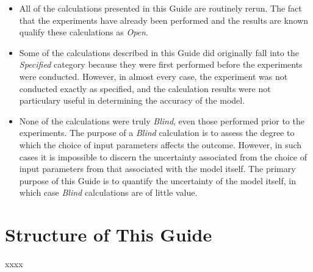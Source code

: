 \begin{itemize}
\item All of the calculations presented in this Guide are routinely rerun. The fact that the experiments have already been performed and the results are known qualify these calculations as {\em Open}.
\item Some of the calculations described in this Guide did originally fall into the {\em Specified} category because they were first performed before the experiments were conducted. However, in almost every case, the experiment was not conducted exactly as specified, and the calculation results were not particulary useful in determining the accuracy of the model. \item None of the calculations were truly {\em Blind}, even those performed prior to the experiments. The purpose of a {\em Blind} calculation is to assess the degree to which the choice of input parameters affects the outcome. However, in such cases it is impossible to discern the uncertainty associated from the choice of input parameters from that associated with the model itself. The primary purpose of this Guide is to quantify the uncertainty of the model itself, in which case {\em Blind} calculations are of little value.
\end{itemize}

\section{Structure of This Guide}

xxxx







